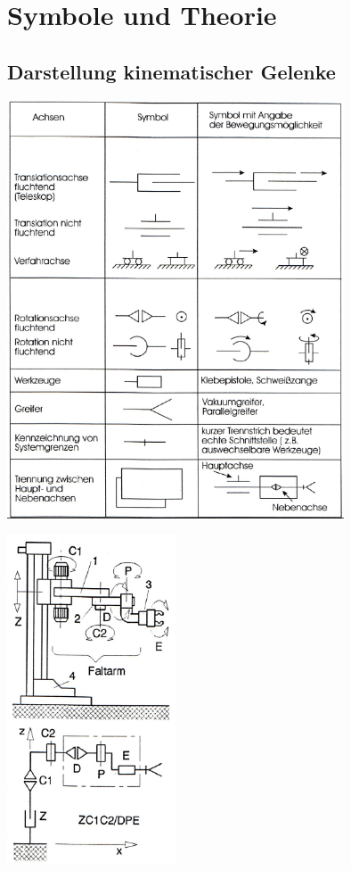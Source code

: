 \section{Symbole und Theorie}
	\subsection{Darstellung kinematischer Gelenke}
		
		\begin{minipage}{10cm}
		\includegraphics[width=10cm]{./bilder/symbole.png}
		\end{minipage}
		\begin{minipage}{8cm}
		\includegraphics[width=5cm]{./bilder/symbole-bsp.png}
		\end{minipage}

